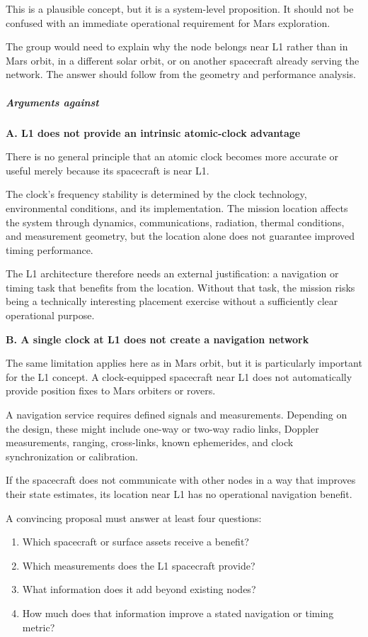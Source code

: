This is a plausible concept, but it is a system-level proposition.
It should not be confused with an immediate operational requirement
for Mars exploration.

The group would need to explain why the node belongs near L1
rather than in Mars orbit, in a different solar orbit, or on
another spacecraft already serving the network. The answer
should follow from the geometry and performance analysis.

\subparagraph{Arguments against}

\textbf{A. L1 does not provide an intrinsic atomic-clock
	advantage}

There is no general principle that an atomic clock becomes more
accurate or useful merely because its spacecraft is near L1.

The clock's frequency stability is determined by the clock
technology, environmental conditions, and its implementation.
The mission location affects the system through dynamics,
communications, radiation, thermal conditions, and measurement
geometry, but the location alone does not guarantee improved
timing performance.

The L1 architecture therefore needs an external justification:
a navigation or timing task that benefits from the location.
Without that task, the mission risks being a technically
interesting placement exercise without a sufficiently clear
operational purpose.

\textbf{B. A single clock at L1 does not create a navigation
	network}

The same limitation applies here as in Mars orbit, but it is
particularly important for the L1 concept. A clock-equipped
spacecraft near L1 does not automatically provide position
fixes to Mars orbiters or rovers.

A navigation service requires defined signals and measurements.
Depending on the design, these might include one-way or
two-way radio links, Doppler measurements, ranging, cross-links,
known ephemerides, and clock synchronization or calibration.

If the spacecraft does not communicate with other nodes in
a way that improves their state estimates, its location near
L1 has no operational navigation benefit.

A convincing proposal must answer at least four questions:

\begin{enumerate}
	\item Which spacecraft or surface assets receive a benefit?
	\item Which measurements does the L1 spacecraft provide?
	\item What information does it add beyond existing nodes?
	\item How much does that information improve a stated
	      navigation or timing metric?
\end{enumerate}

